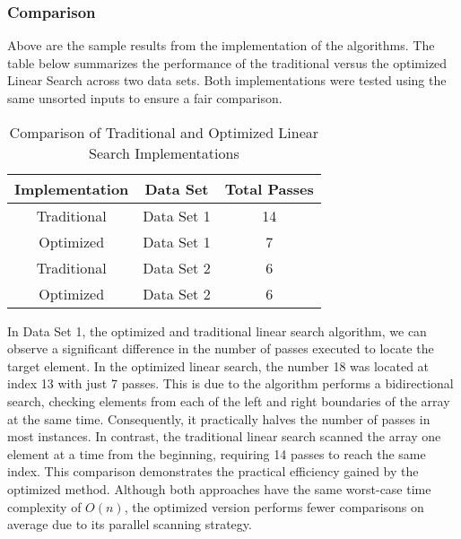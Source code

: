 \subsubsection{Comparison}


Above are the sample results from the implementation of the algorithms. The table below summarizes the performance of the traditional versus the optimized Linear Search across two data sets. Both implementations were tested using the same unsorted inputs to ensure a fair comparison.

\begin{table}[h]
	\centering
	\caption{Comparison of Traditional and Optimized Linear Search Implementations}
	\begin{tabular}{c|c|c}
		\hline
		\textbf{Implementation} & \textbf{Data Set} & \textbf{Total Passes} \\
		\hline
		Traditional & Data Set 1 & 14 \\
		Optimized   & Data Set 1 & 7 \\
		\hline
		Traditional & Data Set 2 & 6 \\
		Optimized   & Data Set 2 & 6 \\
	\end{tabular}
	\label{search_comparison}
\end{table}

In Data Set 1, the optimized and traditional linear search algorithm, we can observe a significant difference in the number of passes executed to locate the target element. In the optimized linear search, the number 18 was located at index 13 with just 7 passes. This is due to the algorithm performs a bidirectional search, checking elements from each of the left and right boundaries of the array at the same time. Consequently, it practically halves the number of passes in most instances. In contrast, the traditional linear search scanned the array one element at a time from the beginning, requiring 14 passes to reach the same index. This comparison demonstrates the practical efficiency gained by the optimized method. Although both approaches have the same worst-case time complexity of $O(n)$, the optimized version performs fewer comparisons on average due to its parallel scanning strategy. 


